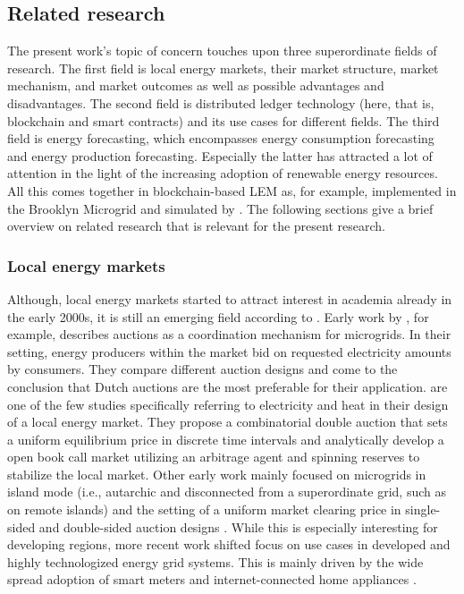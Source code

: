 
\subsection{Related research}\label{Sec:Intro;Subsec:Related}
The present work's topic of concern touches upon three superordinate fields of research. The first field is local energy markets, their market structure, market mechanism, and market outcomes as well as possible advantages and disadvantages. The second field is distributed ledger technology (here, that is, blockchain and smart contracts) and its use cases for different fields. The third field is energy forecasting, which encompasses energy consumption forecasting and energy production forecasting. Especially the latter has attracted a lot of attention in the light of the increasing adoption of renewable energy resources. All this comes together in blockchain-based LEM as, for example, implemented in the Brooklyn Microgrid and simulated by \citet{Mengelkamp:2018a}. The following sections give a brief overview on related research that is relevant for the present research.



\subsubsection{Local energy markets}

Although, local energy markets started to attract interest in academia already in the early 2000s, it is still an emerging field according to \citet{Stadler:2016}. Early work by \citet{Alibhai:2004}, for example, describes auctions as a coordination mechanism for microgrids. In their setting, energy producers within the market bid on requested electricity amounts by consumers. They compare different auction designs and come to the conclusion that Dutch auctions are the most preferable for their application. \citet{Block:2008} are one of the few studies specifically referring to electricity and heat in their design of a local energy market. They propose a combinatorial double auction that sets a uniform equilibrium price in discrete time intervals and analytically develop a open book call market utilizing an arbitrage agent and spinning reserves to stabilize the local market. Other early work mainly focused on microgrids in island mode (i.e., autarchic and disconnected from a superordinate grid, such as on remote islands) and the setting of a uniform market clearing price in single-sided and double-sided auction designs \citep{Sinha:2008}. While this is especially interesting for developing regions, more recent work shifted focus on use cases in developed and highly technologized energy grid systems. This is mainly driven by the wide spread adoption of smart meters and internet-connected home appliances \citep{Burger:2016}.

